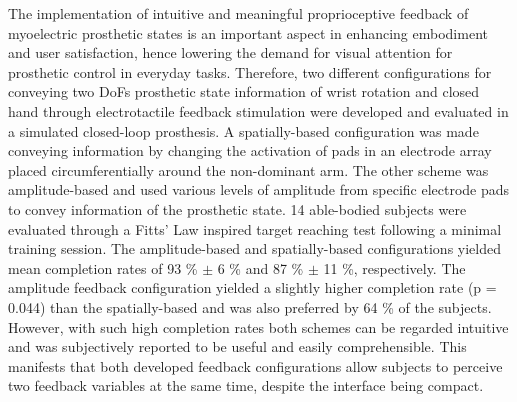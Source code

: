The implementation of intuitive and meaningful proprioceptive feedback of myoelectric prosthetic states is an important aspect in enhancing embodiment and user satisfaction, hence lowering the demand for visual attention for prosthetic control in everyday tasks. Therefore, two different configurations for conveying two DoFs prosthetic state information of wrist rotation and closed hand through electrotactile feedback stimulation were developed and evaluated in a simulated closed-loop prosthesis. A spatially-based configuration was made conveying information by changing the activation of pads in an electrode array placed circumferentially around the non-dominant arm. The other scheme was amplitude-based and used various levels of amplitude from specific electrode pads to convey information of the prosthetic state. 14 able-bodied subjects were evaluated through a Fitts' Law inspired target reaching test following a minimal training session.
The amplitude-based and spatially-based configurations yielded mean completion rates of 93 \% $\boldsymbol{\pm}$ 6 \% and 87 \% $\boldsymbol{\pm}$ 11 \%, respectively. The amplitude feedback configuration yielded a slightly higher completion rate (p = 0.044) than the spatially-based and was also preferred by 64 \% of the subjects. However, with such high completion rates both schemes can be regarded intuitive and was subjectively reported to be useful and easily comprehensible. This manifests that both developed feedback configurations allow subjects to perceive two feedback variables at the same time, despite the interface being compact. 
 
 
 
